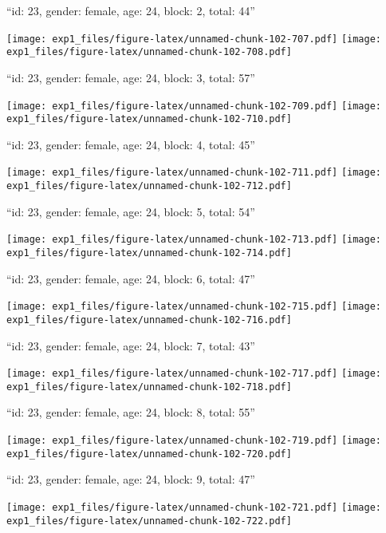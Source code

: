 \documentclass[11pt,,]{article}
\begin{document}
\newpage
[1] 

``id: 23, gender: female, age: 24, block: 2, total: 44''

\texttt{[image: exp1\_files/figure-latex/unnamed-chunk-102-707.pdf]}
\texttt{[image: exp1\_files/figure-latex/unnamed-chunk-102-708.pdf]}

\newpage
[1] 

``id: 23, gender: female, age: 24, block: 3, total: 57''

\texttt{[image: exp1\_files/figure-latex/unnamed-chunk-102-709.pdf]}
\texttt{[image: exp1\_files/figure-latex/unnamed-chunk-102-710.pdf]}

\newpage
[1] 

``id: 23, gender: female, age: 24, block: 4, total: 45''

\texttt{[image: exp1\_files/figure-latex/unnamed-chunk-102-711.pdf]}
\texttt{[image: exp1\_files/figure-latex/unnamed-chunk-102-712.pdf]}

\newpage
[1] 

``id: 23, gender: female, age: 24, block: 5, total: 54''

\texttt{[image: exp1\_files/figure-latex/unnamed-chunk-102-713.pdf]}
\texttt{[image: exp1\_files/figure-latex/unnamed-chunk-102-714.pdf]}

\newpage
[1] 

``id: 23, gender: female, age: 24, block: 6, total: 47''

\texttt{[image: exp1\_files/figure-latex/unnamed-chunk-102-715.pdf]}
\texttt{[image: exp1\_files/figure-latex/unnamed-chunk-102-716.pdf]}

\newpage
[1] 

``id: 23, gender: female, age: 24, block: 7, total: 43''

\texttt{[image: exp1\_files/figure-latex/unnamed-chunk-102-717.pdf]}
\texttt{[image: exp1\_files/figure-latex/unnamed-chunk-102-718.pdf]}

\newpage
[1] 

``id: 23, gender: female, age: 24, block: 8, total: 55''

\texttt{[image: exp1\_files/figure-latex/unnamed-chunk-102-719.pdf]}
\texttt{[image: exp1\_files/figure-latex/unnamed-chunk-102-720.pdf]}

\newpage
[1] 

``id: 23, gender: female, age: 24, block: 9, total: 47''

\texttt{[image: exp1\_files/figure-latex/unnamed-chunk-102-721.pdf]}
\texttt{[image: exp1\_files/figure-latex/unnamed-chunk-102-722.pdf]}
\end{document}
